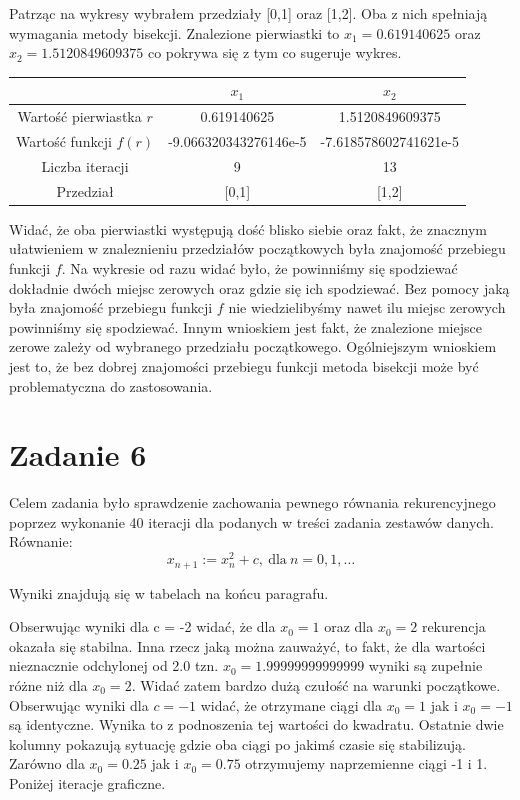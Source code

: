 \documentclass[]{article}
\begin{document}
	Patrząc na wykresy wybrałem przedziały [0,1] oraz [1,2]. Oba z nich spełniają wymagania metody bisekcji. Znalezione pierwiastki to $x_1=0.619140625$ oraz $x_2=1.5120849609375$ co pokrywa się z tym co sugeruje wykres.
	
	
	\begin{table}[!h]
		\centering
		\label{tab:table1}
		\begin{tabular}{c|c|c}
			
			 & $x_1$ & $x_2$ \\ \hline
			Wartość pierwiastka $r$ &  0.619140625 & 1.5120849609375 \\ 
			Wartość funkcji $f(r)$ & -9.066320343276146e-5 & -7.618578602741621e-5  \\ 
			Liczba iteracji & 9 & 13 \\
			Przedział & [0,1] & [1,2] \\
		\end{tabular}
	\end{table}

	Widać, że oba pierwiastki występują dość blisko siebie oraz fakt, że znacznym ułatwieniem w znaleznieniu przedziałów początkowych była znajomość przebiegu funkcji $f$. Na wykresie od razu widać było, że powinniśmy się spodziewać dokładnie dwóch miejsc zerowych oraz gdzie się ich spodziewać. Bez pomocy jaką była znajomość przebiegu funkcji $f$ nie wiedzielibyśmy nawet ilu miejsc zerowych powinniśmy się spodziewać. Innym wnioskiem jest fakt, że znalezione miejsce zerowe zależy od wybranego przedziału początkowego. Ogólniejszym wnioskiem jest to, że bez dobrej znajomości przebiegu funkcji metoda bisekcji może być problematyczna do zastosowania. 

	\clearpage
	
	\section*{Zadanie 6}
	
	Celem zadania było sprawdzenie zachowania pewnego równania rekurencyjnego poprzez wykonanie 40 iteracji dla podanych w treści zadania zestawów danych. Równanie:
	$$x_{n+1} := x^2_n + c, \ \textrm{dla} \ n = 0,1,\dots$$
	
	Wyniki znajdują się w tabelach na końcu paragrafu.
	
	

	Obserwując wyniki dla c = -2 widać, że dla $x_0 = 1$ oraz dla $x_0 = 2$ rekurencja okazała się stabilna. Inna rzecz jaką można zauważyć, to fakt, że dla wartości nieznacznie odchylonej od 2.0 tzn. $x_0 = 1.99999999999999$ wyniki są zupełnie różne niż dla $x_0 = 2$. Widać zatem bardzo dużą czułość na warunki początkowe. Obserwując wyniki dla $c = -1$ widać, że otrzymane ciągi dla $x_0 = 1$ jak i $x_0 = -1$ są identyczne. Wynika to z podnoszenia tej wartości do kwadratu. Ostatnie dwie kolumny pokazują sytuację gdzie oba ciągi po jakimś czasie się stabilizują. Zarówno dla $x_0 = 0.25$ jak i $x_0 = 0.75$ otrzymujemy naprzemienne ciągi -1 i 1. Poniżej iteracje graficzne.
	
\end{document}
